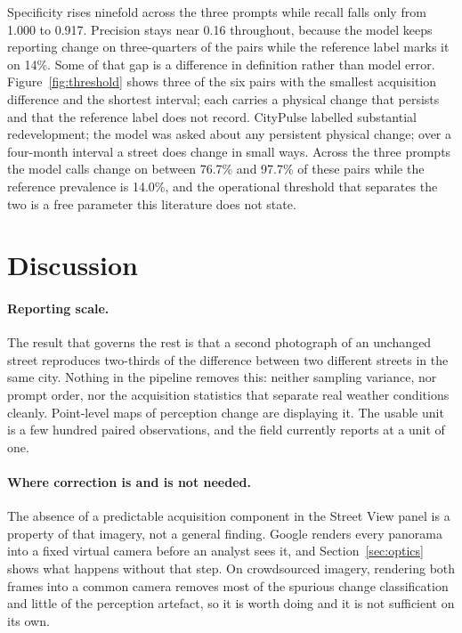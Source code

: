 Specificity rises ninefold across the three prompts while recall falls only from
1.000 to 0.917. Precision stays near 0.16 throughout, because the model keeps
reporting change on three-quarters of the pairs while the reference label marks
it on 14\%. Some of that gap is a difference in definition rather than model
error. Figure~\ref{fig:threshold} shows three of the six pairs with the
smallest acquisition difference and the shortest interval; each carries a
physical change that persists and that the reference label does not record.
CityPulse labelled substantial redevelopment;
the model was asked about any persistent physical change; over a four-month
interval a street does change in small ways. Across the three prompts the model
calls change on between 76.7\% and 97.7\% of these pairs while the reference
prevalence is 14.0\%, and the operational threshold that separates the two is a
free parameter this literature does not state.

\section{Discussion}

\paragraph{Reporting scale.}
The result that governs the rest is that a second photograph of an unchanged
street reproduces two-thirds of the difference between two different streets in
the same city. Nothing in the pipeline removes this: neither sampling variance,
nor prompt order, nor the acquisition statistics that separate real weather
conditions cleanly. Point-level maps of perception change are displaying it. The
usable unit is a few hundred paired observations, and the field currently
reports at a unit of one.

\paragraph{Where correction is and is not needed.}
The absence of a predictable acquisition component in the Street View panel is a
property of that imagery, not a general finding. Google renders every panorama
into a fixed virtual camera before an analyst sees it, and
Section~\ref{sec:optics} shows what happens without that step. On crowdsourced
imagery, rendering both frames into a common camera removes most of the spurious
change classification and little of the perception artefact, so it is worth
doing and it is not sufficient on its own.

